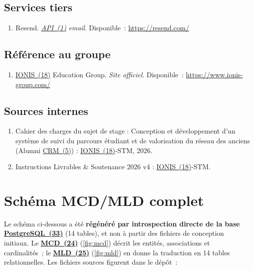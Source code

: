 \documentclass[12pt,a4paper]{report}
\begin{document}
\section*{Services tiers}

\begin{enumerate}[resume]
  \item Resend. \textit{\hyperlink{abbr-API}{API~(1)} email}. Disponible~: \url{https://resend.com/}
\end{enumerate}

\section*{Référence au groupe}

\begin{enumerate}[resume]
  \item \hyperlink{abbr-IONIS}{IONIS~(18)} Education Group. \textit{Site officiel}. Disponible~: \url{https://www.ionis-group.com/}
\end{enumerate}

\section*{Sources internes}

\begin{enumerate}[resume]
  \item Cahier des charges du sujet de stage : \og{}Conception et développement d'un système de suivi du parcours étudiant et de valorisation du réseau des anciens (Alumni \hyperlink{abbr-CRM}{CRM~(5)})\fg{} : \hyperlink{abbr-IONIS}{IONIS~(18)}-STM, 2026.
  \item Instructions Livrables \& Soutenance 2026 v4 : \hyperlink{abbr-IONIS}{IONIS~(18)}-STM.
\end{enumerate}

\appendix

\chapter{Schéma MCD/MLD complet}

Le schéma ci-dessous a été \textbf{régénéré par introspection directe de la base \hyperlink{abbr-PostgreSQL}{PostgreSQL~(33)}} (14 tables), et non à partir des fichiers de conception initiaux. Le \textbf{\hyperlink{abbr-MCD}{MCD~(24)}} (\autoref{fig:mcd}) décrit les entités, associations et cardinalités~; le \textbf{\hyperlink{abbr-MLD}{MLD~(25)}} (\autoref{fig:mld}) en donne la traduction en 14 tables relationnelles. Les fichiers sources figurent dans le dépôt~:
\end{document}
